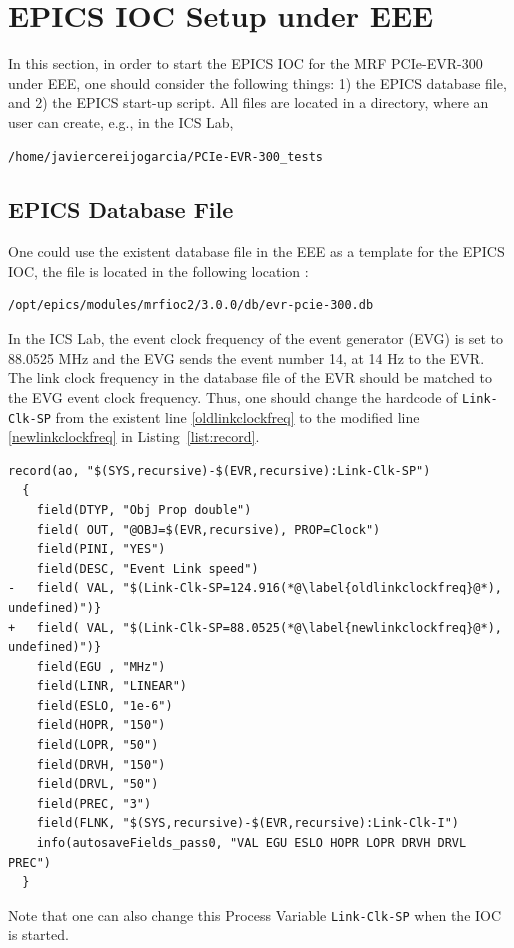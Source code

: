 \documentclass[11pt
  , a4paper
  , article
  , oneside
  , showtrims
]{memoir}
\begin{document}
\clearpage
\section{EPICS IOC Setup under EEE}
In this section, in order to start the EPICS IOC for the MRF PCIe-EVR-300 under EEE, one should consider the following things: 1) the EPICS database file, and 2) the EPICS start-up script. All files are located in a directory, where an user can create, e.g., in the ICS Lab, 
\begin{lstlisting}[style=termstyle, label={list:pwd}, caption={Working Directory in the ICS lab.} ]
  /home/javiercereijogarcia/PCIe-EVR-300_tests
\end{lstlisting}

\subsection{EPICS Database File}
One could use the existent database file in the EEE as a template for the EPICS IOC, the file is located in the following location : 
\begin{lstlisting}[style=termstyle]
  /opt/epics/modules/mrfioc2/3.0.0/db/evr-pcie-300.db
\end{lstlisting}

In the ICS Lab, the event clock frequency of the event generator (EVG) is set to 88.0525 MHz and the EVG sends the event number 14, at 14 Hz to the EVR. The link clock frequency in the database file of the EVR should be matched to the EVG event clock frequency. Thus, one should change the hardcode of \texttt{Link-Clk-SP} from the existent line \ref{oldlinkclockfreq} to  the modified line \ref{newlinkclockfreq} in Listing~\ref{list:record}. 
\begin{lstlisting}[style=termstylenumber, label={list:record}, caption={The record has the link clock frequency.}] 
  record(ao, "$(SYS,recursive)-$(EVR,recursive):Link-Clk-SP")
  {
    field(DTYP, "Obj Prop double")
    field( OUT, "@OBJ=$(EVR,recursive), PROP=Clock")
    field(PINI, "YES")
    field(DESC, "Event Link speed")
-   field( VAL, "$(Link-Clk-SP=124.916(*@\label{oldlinkclockfreq}@*), undefined)")}
+   field( VAL, "$(Link-Clk-SP=88.0525(*@\label{newlinkclockfreq}@*), undefined)")}
    field(EGU , "MHz")
    field(LINR, "LINEAR")
    field(ESLO, "1e-6")
    field(HOPR, "150")
    field(LOPR, "50")
    field(DRVH, "150")
    field(DRVL, "50")
    field(PREC, "3")
    field(FLNK, "$(SYS,recursive)-$(EVR,recursive):Link-Clk-I")
    info(autosaveFields_pass0, "VAL EGU ESLO HOPR LOPR DRVH DRVL PREC")
  }
\end{lstlisting}
Note that one can also change this Process Variable \texttt{Link-Clk-SP} when the IOC is started. 
\end{document}
